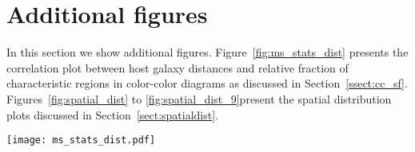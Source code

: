 \documentclass[linenumbers]{aastex63}
\begin{document}
\section{Additional figures}\label{append:add_fig}
In this section we show additional figures. Figure~\ref{fig:ms_stats_dist} presents the correlation plot between host galaxy distances and relative fraction of characteristic regions in color-color diagrams as discussed in Section~\ref{ssect:cc_sf}. Figures~\ref{fig:spatial_dist} to \ref{fig:spatial_dist_9}present the spatial distribution plots discussed in Section~\ref{sect:spatialdist}.
%
\begin{figure*}
\texttt{[image: ms\_stats\_dist.pdf]}
 \caption{Number fraction of C1 and C2 clusters of each galaxy associated with the main characteristic regions in color-color diagrams found in Section~\ref{ssect:cc_regions} as a function of galaxy distance. We show the YCL, the MAP and the OGC in blue, green and red, respectively. In gray, we show clusters outside the main regions. We distinguish distance measurements which are estimated from stellar markers such as Tip of the Red giant Branch (TRGB) or from Cepheid variable stars are marked with full circles whereas other distant measurements which are less precise are marked by empty circles. A complete discussion on each individual distance measurement is provided in \citet{anand_distances_2020} and \citet{anand_distances_2021}. For each panel we show the Pearson correlation coefficient in the top right.}
 \label{fig:ms_stats_dist}
\end{figure*}
%


%
%
%
\end{document}
